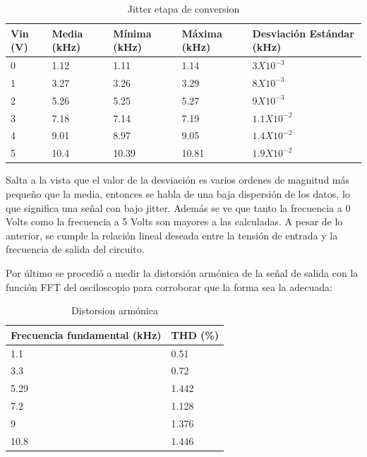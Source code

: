 \begin{table}[H]
\centering
\begin{tabular}{lllll}\hline
Vin (V) &  Media (kHz) &  Mínima (kHz) &  Máxima (kHz) & Desviación Estándar (kHz) \\ \hline
0       & 1.12                   & 1.11                    & 1.14                    & $3X10^{-3}$                   \\
1       & 3.27                   & 3.26                    & 3.29                    & $8X10^{-3}$                         \\
2       & 5.26                   & 5.25                    & 5.27                    & $9X10^{-3}$                         \\
3       & 7.18                   & 7.14                    & 7.19                    & $1.1X10^{-2}$                         \\
4       & 9.01                   & 8.97                    & 9.05                    & $1.4X10^{-2}$                         \\
5       & 10.4                   & 10.39                   & 10.81                   & $1.9X10^{-2}$                        \\ \hline
\end{tabular}
\caption{Jitter etapa de conversion}
\end{table}

Salta a la vista que el valor de la desviación es varios ordenes de magnitud más pequeño que la media, entonces se habla de una baja dispersión de los datos, lo que significa una señal con bajo jitter. Además se ve que tanto la frecuencia a 0 Volts como la frecuencia a 5 Volts son mayores a las calculadas. A pesar de lo anterior, se cumple la relación lineal deseada entre la tensión de entrada y la frecuencia de salida del circuito. 

Por último se procedió a medir la distorsión armónica de la señal de salida con la función FFT del osciloscopio para corroborar que la forma sea la adecuada:

\begin{table}[H]
\centering
\begin{tabular}{ll}\hline
\multicolumn{1}{c}{Frecuencia fundamental (kHz)} & THD (\%) \\ \hline
1.1                                              & 0.51     \\
3.3                                              & 0.72     \\
5.29                                             & 1.442    \\
7.2                                              & 1.128    \\
9                                                & 1.376    \\
10.8                                             & 1.446   \\ \hline
\end{tabular}
\caption{Distorsion armónica}
\end{table}

